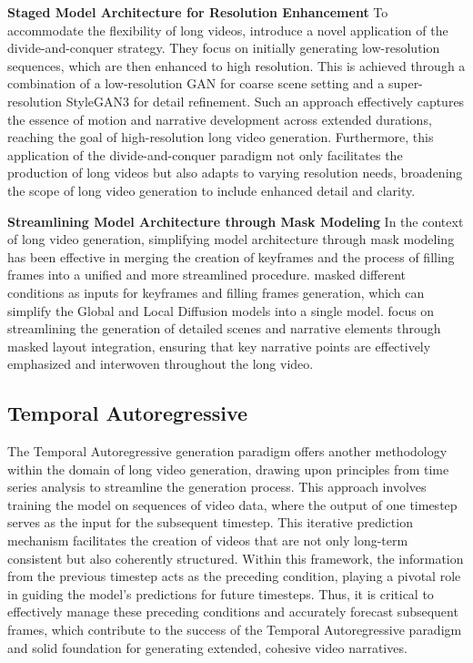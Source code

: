 \documentclass{article}
\begin{document}
\noindent\textbf{Staged Model Architecture for Resolution Enhancement}
To accommodate the flexibility of long videos, \cite{Generating} introduce a novel application of the divide-and-conquer strategy. They focus on initially generating low-resolution sequences, which are then enhanced to high resolution. This is achieved through a combination of a low-resolution GAN for coarse scene setting and a super-resolution StyleGAN3 for detail refinement. Such an approach effectively captures the essence of motion and narrative development across extended durations, reaching the goal of high-resolution long video generation. Furthermore, this application of the divide-and-conquer paradigm not only facilitates the production of long videos but also adapts to varying resolution needs, broadening the scope of long video generation to include enhanced detail and clarity.

\noindent\textbf{Streamlining Model Architecture through Mask Modeling}
In the context of long video generation, simplifying model architecture through mask modeling has been effective in merging the creation of keyframes and the process of filling frames into a unified and more streamlined procedure. \cite{Cogvideo} masked different conditions as inputs for keyframes and filling frames generation, which can simplify the Global and Local Diffusion models into a single model. \cite{huang2023video} focus on streamlining the generation of detailed scenes and narrative elements through masked layout integration, ensuring that key narrative points are effectively emphasized and interwoven throughout the long video.

\subsection{Temporal Autoregressive}
\label{sec: temporal autoregressive}
The Temporal Autoregressive generation paradigm offers another methodology within the domain of long video generation, drawing upon principles from time series analysis to streamline the generation process. This approach involves training the model on sequences of video data, where the output of one timestep serves as the input for the subsequent timestep. This iterative prediction mechanism facilitates the creation of videos that are not only long-term consistent but also coherently structured. Within this framework, the information from the previous timestep acts as the preceding condition, playing a pivotal role in guiding the model's predictions for future timesteps. Thus, it is critical to effectively manage these preceding conditions and accurately forecast subsequent frames, which contribute to the success of the Temporal Autoregressive paradigm and solid foundation for generating extended, cohesive video narratives.
\end{document}
